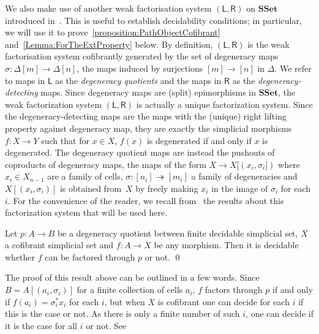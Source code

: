 \documentclass[reqno,10pt,a4paper,oneside,draft]{amsart}
\numberwithin{equation}{section}
\theoremstyle{mythm}
\theoremstyle{mydef}
\theoremstyle{myrmk}
\newcommand{\ie}{\text{i.e.\ }}
\newcommand{\co}{\colon}
\newcommand{\SSet}{\mathbf{SSet}}
\begin{document}
\medskip

We also make use of another weak factorisation system $(\mathsf{L}, \mathsf{R})$ on $\SSet$ introduced in~\cite[Section~3.1]{henry2019qms}. This is useful to establish decidability conditions; in particular, we will use it to prove~\cref{proposition:PathObjectCofibrant} and~\cref{Lemma:ForTheExtProperty} below. By definition, $(\mathsf{L}, \mathsf{R})$ is the
weak factorisation system cofibrantly generated by the set of degeneracy maps $\sigma \co \Delta[m] \to \Delta[n]$, \ie the maps induced by surjections $[m] \rightarrow [n]$ in $\Delta$. We refer to maps in $\mathsf{L}$ as the \emph{degeneracy quotients} and the
maps in $\mathsf{R}$ as the \emph{degeneracy-detecting} maps. Since degeneracy maps are (split) epimorphisms in $\SSet$, the weak factorization system $(\mathsf{L}, \mathsf{R})$ is actually a unique factorization system. Since the degeneracy-detecting maps are the maps with the (unique) right lifting property against degeneracy map,  they are exactly the simplicial morphisms $f \co X \rightarrow Y$ such that for $x \in X$, $f(x)$ is degenerated if and only if $x$ is degenerated. The degeneracy quotient maps are
instead the pushouts of coproducts of degeneracy maps, \ie the maps of the form $X \rightarrow X[(x_i,\sigma_i])$ where $x_i \in X_{n-1}$ are a family of cells,  $\sigma \co [n_i] \twoheadrightarrow [m_i]$ a family of degeneracies and $X[(x_i,\sigma_i)]$ is obtained from~$X$ by freely making $x_i$ in the image of $\sigma_i $ for each $i$. For the convenience of the reader, we recall from~\cite{henry2019qms} 
 the results  about this factorization system that will be used here.


\begin{lemma}
\label{lem:decidability_lift_degen_quo}
Let $p \co A \rightarrow B$ be a degeneracy quotient between finite decidable simplicial set, $X$  a cofibrant simplicial set and $f \co
A \rightarrow X$ be any morphism. Then it is decidable whether $f$ can be factored through $p$ or not.  \qed
\end{lemma}

The proof of this result above can be outlined in a few words. Since $B = A[(a_i,\sigma_i)]$ for a finite collection of cells $a_i$,  $f$ factors through $p$ if and only if $f(a_i) =\sigma_i^*  x_i$ for each $i$, but when $X$ is cofibrant one can decide for each $i$ if this is the case or not. As there is only a finite number of such $i$, one can decide if it is the case for all $i$ or not. See
\end{document}
